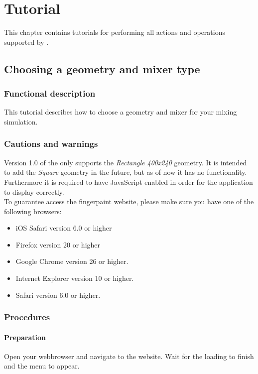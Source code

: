 \chapter{Tutorial}
This chapter contains tutorials for performing all actions and operations supported by \projectname.

\section{Choosing a geometry and mixer type}
\label{sec:ChooseGeomAndMixer}

\subsection{Functional description}
This tutorial describes how to choose a geometry and mixer for your mixing simulation.

\subsection{Cautions and warnings}

Version 1.0 of the \applicationname{} only supports the \emph{Rectangle 400x240} geometry. It is intended to add the \emph{Square} geometry in the future, but as of now it has no functionality. Furthermore it is required to have JavaScript enabled in order for the application to display correctly.\\

\noindent To guarantee access the fingerpaint website, please make sure you have one of the following browsers:\\
\begin{itemize}
\item iOS Safari version 6.0 or higher
\item Firefox version 20 or higher
\item Google Chrome version 26 or higher.
\item Internet Explorer version 10 or higher.
\item Safari version 6.0 or higher.
\end{itemize}

\subsection{Procedures}

\subsubsection{Preparation}
Open your webbrowser and navigate to the \projectname{} website. Wait for the loading to finish and the menu to appear.

